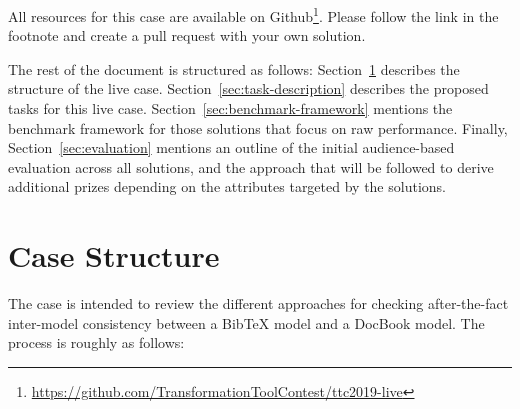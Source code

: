 \documentclass[a4paper]{scrartcl}
\begin{document}
All resources for this case are available on
Github\footnote{\url{https://github.com/TransformationToolContest/ttc2019-live}}.
Please follow the link in the footnote and create a pull request with your own
solution.

The rest of the document is structured as follows:
Section~\ref{sec:case-structure} describes the structure of the live case.
Section~\ref{sec:task-description} describes the proposed tasks for this live
case. Section~\ref{sec:benchmark-framework} mentions the benchmark framework for
those solutions that focus on raw performance. Finally,
Section~\ref{sec:evaluation} mentions an outline of the initial audience-based
evaluation across all solutions, and the approach that will be followed to
derive additional prizes depending on the attributes targeted by the solutions.

\section{Case Structure}
\label{sec:case-structure}

The case is intended to review the different approaches for checking
after-the-fact inter-model consistency between a BibTeX model and a DocBook
model. The process is roughly as follows:
\end{document}
